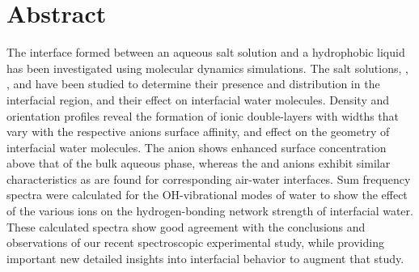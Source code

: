 \section{Abstract}



The interface formed between an aqueous salt solution and a hydrophobic liquid has been investigated using molecular dynamics simulations. The salt solutions, \nacl, \sodnit, and \sodsul have been studied to determine their presence and distribution in the interfacial region, and their effect on interfacial water molecules. Density and orientation profiles reveal the formation of ionic double-layers with widths that vary with the respective anions surface affinity, and effect on the geometry of interfacial water molecules. The \nit anion shows enhanced surface concentration above that of the bulk aqueous phase, whereas the \cl and \sul anions exhibit similar characteristics as are found for corresponding air-water interfaces. Sum frequency spectra were calculated for the OH-vibrational modes of water to show the effect of the various ions on the hydrogen-bonding network strength of interfacial water. These calculated spectra show good agreement with the conclusions and observations of our recent spectroscopic experimental study, while providing important new detailed insights into interfacial behavior to augment that study.
